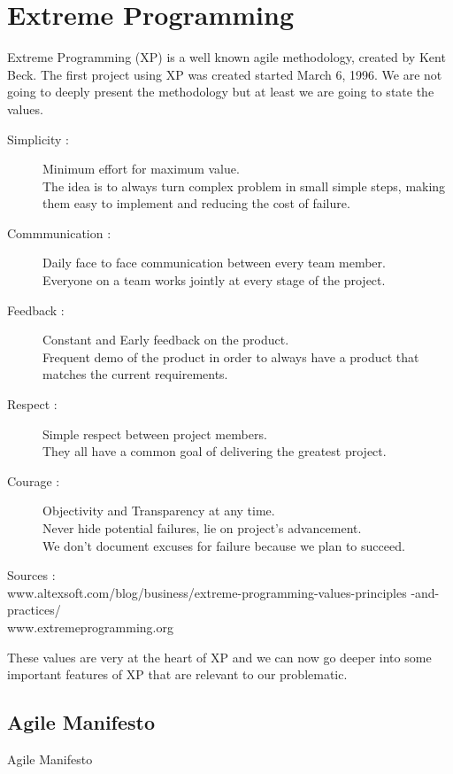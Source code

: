 \section{Extreme Programming}\label{sec:extreme-programming}
Extreme Programming (XP) is a well known agile methodology, created by
Kent Beck.
The first project using XP was created started March 6, 1996.
We are not going to deeply present the methodology but at least we are
going to state the values.

\begin{description}
    \item[Simplicity :] Minimum effort for maximum value. \\
    The idea is to always turn complex problem in small simple steps,
    making them easy to implement and reducing the cost of failure.
    \item[Commmunication :] Daily face to face communication between
    every team member. \\
    Everyone on a team works jointly at every stage of the project.
    \item[Feedback :] Constant and Early feedback on the product. \\
    Frequent demo of the product in order to always have a product that
    matches the current requirements.
    \item[Respect :] Simple respect between project members. \\
    They all have a common goal of delivering the greatest project.
    \item[Courage :] Objectivity and Transparency at any time. \\
    Never hide potential failures, lie on project's advancement. \\
    We don't document excuses for failure because we plan to succeed.
\end{description}

\big Sources :
\\ www.altexsoft.com/blog/business/extreme-programming-values-principles
-and-practices/
\\ www.extremeprogramming.org

These values are very at the heart of XP and we can now go deeper into some
important features of XP that are relevant to our problematic.

\subsection{Agile Manifesto}\label{subsec:agile-manifesto2}
Agile Manifesto


